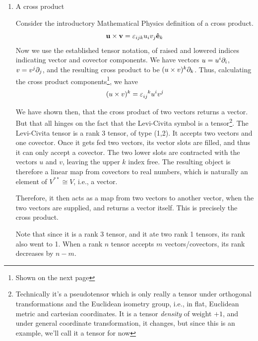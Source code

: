 \begin{enumerate}[(1)]
				Now consider feeding the matrix both a vector and a covector. You will find that
				\[
					\bmqty{
						\omega_1& \omega_2	
					} 
					\bmqty{
						a_{11} & a_{12}\\
						a_{21} & a_{22}\\
					} 
					\bmqty{
						v_1\\ v_2	
					} 
					=
						v_1 \omega_1 a_{11} + v_1 \omega_2 a_{21} +
						v_2 \omega_1 a_{12} + v_2 \omega_2 a_{22}
				\]

				Therefore, it returned a scalar, which is precisely what a tensor is defined to do.
				It accepted one covector, and one vector, and returned a real number.
			\item A cross product

				Consider the introductory Mathematical Physics definition of a cross product.
				\[
					\vb{u}\times \vb{v} = \varepsilon_{ijk} u_i v_j \vu{e}_k
				\]
				Now we use the established tensor notation, of raised and lowered indices
				indicating vector and covector components. We have vectors $u = u^i\partial_i$, $v = v^j\partial_j$,
				and the resulting cross product to be $(u\times v)^k \partial_k$. Thus, calculating the cross
				product components\footnote{Shown on the next page}, we have
				\[
					(u\times v)^k = 
					\tensor{\varepsilon}{_{ij}^k} u^i v^j
				\]
				
				We have shown then, that the cross product of two vectors
				returns a vector. But that all hinges on the fact that the 
				Levi-Civita symbol is a tensor\footnote{Technically it's a 
				pseudotensor which is only really a tensor under orthogonal
				transformations and the Euclidean isometry group, i.e.,
				in flat, Euclidean metric and cartesian coordinates. It is a
				tensor \textit{density} of weight $+1$, and under general coordinate
				transformation, it changes, but since this is an example, we'll 
				call it a tensor for now}. The 
				Levi-Civita tensor is a rank 3 tensor, of type (1,2).
				It accepts 
				two vectors and one covector. Once it gets fed
				two vectors, its vector slots are filled, and thus it can only accept 
				a covector. The two lower slots are contracted with the vectors $u$ and $v$, leaving the upper $k$ index free.
				The resulting object is therefore a linear map from covectors to real numbers, which is naturally
				an element of $V^{**}\cong V$, i.e., a vector. 

				Therefore, it then acts as a map from two vectors to another vector,
				when the two vectors are supplied, and returns a vector itself. This is
				precisely the cross product.

				Note that since it is a rank 3 tensor, and it ate two rank 1 tensors, its rank
				also went to 1. When a rank $n$ tensor accepts $m$ vectors/covectors, its rank
				decreases by $n-m$.
		\end{enumerate}

